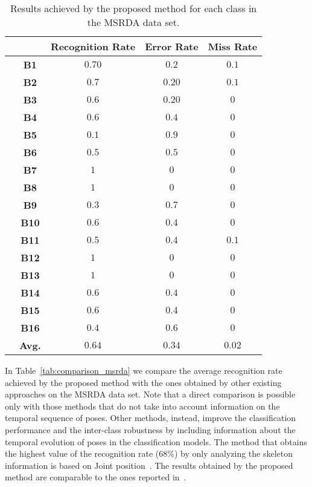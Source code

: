 \documentclass[runningheads,a4paper]{llncs}
\begin{document}
\begin{table}
\begin{scriptsize}
\setlength\tabcolsep{0.2cm}
	\renewcommand{\arraystretch}{1.3}
	\centering
	\begin{tabular}{|c|c|c|c|c|}
			\hline
		\multicolumn{2}{|c|}{~} & \bfseries Recognition Rate & \bfseries Error Rate & \bfseries Miss  Rate \\ \hline
    			
			\multirow{17}{*}{\rotatebox{90}{\bfseries Classes}} & \textbf{B1} & ${0.70}$ &$0.2$ & $0.1$	 \\
			~ & \textbf{B2} & ${0.7}$ 	&$0.20 $ & $0.1$  \\
			~ & \textbf{B3} & ${0.6}$ 	&$0.20 $ & $0$  \\
			~ & \textbf{B4} & ${0.6}$ 	&$0.4 $ & $0$  \\
			~ & \textbf{B5} & ${0.1}$ 	&$0.9 $ & $0$  \\
			~ & \textbf{B6} & ${0.5}$ 	&$0.5 $ & $0$  \\
			~ & \textbf{B7} & ${1}$ 	&$0 $ & $0$  \\
			~ & \textbf{B8} & ${1}$ 	&$0 $ & $0$  \\
			~ & \textbf{B9} & ${0.3}$ 	&$0.7 $ & $0$  \\
			~ & \textbf{B10} & ${0.6}$ 	&$0.4 $ & $0$  \\
			~ & \textbf{B11} & ${0.5}$ 	&$0.4 $ & $0.1$  \\
			~ & \textbf{B12} & ${1}$ 	&$0 $ & $0$ \\
			~ & \textbf{B13} & ${1}$ 	&$0 $ & $0$\\
			~ & \textbf{B14} & ${0.6}$ 	&$0.4 $ & $0$  \\
			~ & \textbf{B15} & ${0.6}$ 	&$0.4 $ & $0$  \\
			~ & \textbf{B16} & ${0.4}$ 	&$0.6 $ & $0$  \\  \hline 			
			~ & \textbf{Avg.} & ${0.64}$ &$0.34 $ & $0.02$  \\  \hline 			
		\end{tabular}
		\vspace{2mm}
	\caption{Results achieved by the proposed method for each class in the MSRDA data set.}
	\label{tab:miscl_msrda}
	\end{scriptsize}
\end{table} 




In Table~\ref{tab:comparison_msrda} we compare the average recognition rate achieved by the proposed method with the ones obtained by other existing approaches on the MSRDA data set. Note that a direct comparison is possible only with those methods that do not take into account information on the temporal sequence of poses. Other methods, instead, improve the classification performance and the inter-class robustness by including information about the temporal evolution of poses in the classification models. The method that obtains the highest value of the recognition rate ($68 \%$)  by only analyzing the skeleton information is based on Joint position~\cite{Wu12_dataset}. The results obtained by the proposed method are comparable to the ones reported in~\cite{Wu12_dataset}. 
\end{document}
